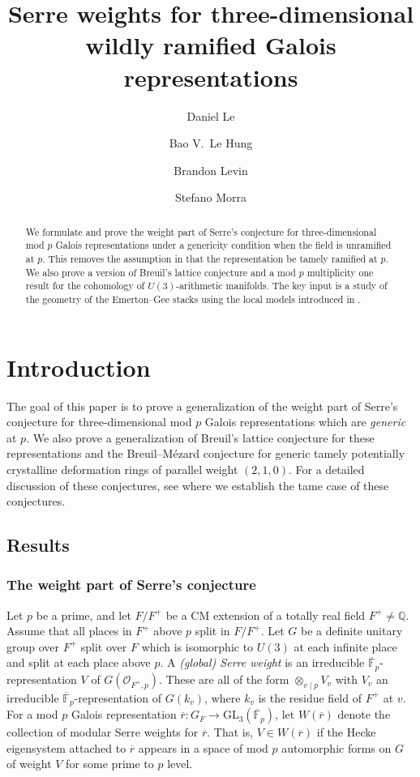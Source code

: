 \documentclass[oneside,a4paper,english, 11pt]{amsart}
\title{Serre weights for three-dimensional wildly ramified Galois representations}
\author{Daniel Le}
\author{Bao V.~Le Hung}
\author{Brandon Levin}
\author{Stefano Morra}
\theoremstyle{plain}
\theoremstyle{plain}
\theoremstyle{plain}
\theoremstyle{plain}
\theoremstyle{plain}
\theoremstyle{plain}
\theoremstyle{definition}
\theoremstyle{definition}
\theoremstyle{definition}
\theoremstyle{remark}
\numberwithin{equation}{section}
\newcommand{\Q}{\mathbb{Q}}
\newcommand{\F}{\mathbb{F}}
\newcommand{\cO}{\mathcal{O}}
\newcommand{\GL}{\mathrm{GL}}
\newcommand{\rbar}{\overline{r}}
\begin{document}
\begin{abstract}
We formulate and prove the weight part of Serre's conjecture for three-dimensional mod $p$ Galois representations under a genericity condition when the field is unramified at $p$.  This removes the assumption in \cite{LLLM, LLLM2} that the representation be tamely ramified at $p$.    We also prove a version of Breuil's lattice conjecture and a mod $p$ multiplicity one result for the cohomology of $U(3)$-arithmetic manifolds.  The key input is a study of the geometry of the Emerton--Gee stacks \cite{EGstack} using the local models introduced in \cite{MLM}.  
\end{abstract} 



\maketitle
\tableofcontents


%
\section{Introduction}



The goal of this paper is to prove a generalization of the weight part of Serre's conjecture for three-dimensional mod $p$ Galois representations which are \emph{generic} at $p$. We also prove a generalization of Breuil's lattice conjecture for these representations and the Breuil--M\'ezard conjecture for generic tamely potentially crystalline deformation rings of parallel weight $(2,1,0)$. 
For a detailed discussion of these conjectures, see \cite{LLLM2} where we establish the tame case of these conjectures. 

\subsection{Results}\label{sec:global:prelim}
\subsubsection{The weight part of Serre's conjecture}
 
Let $p$ be a prime, and let $F/F^+$ be a CM extension of a totally real field $F^+\neq \Q$.  Assume that all places in $F^+$ above $p$ split in $F/F^+$. 
%
Let $G$ be a definite unitary group over $F^+$ split over $F$ which is isomorphic to $U(3)$ at each infinite place and split at each place above $p$. 
A \emph{(global) Serre weight} is an irreducible $\overline{\F}_p$-representation $V$ of $G(\cO_{F^+, p})$.
These are all of the form $\otimes_{v \mid p} V_v$ with $V_v$ an irreducible $\overline{\F}_p$-representation of $G(k_v)$, where $k_v$ is the residue field of $F^+$ at $v$. 
For a mod $p$ Galois representation $\rbar:G_F \rightarrow \GL_3(\overline{\F}_p)$, let $W(\rbar)$ denote the collection of modular Serre weights for $\rbar$. 
That is, $V \in W(\rbar)$ if the Hecke eigensystem attached to $\rbar$ appears in a space of mod $p$ automorphic forms on $G$ of weight $V$ for some prime to $p$ level. 
\end{document}
